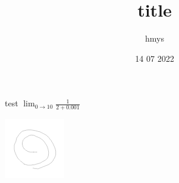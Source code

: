 \documentclass{article}
\title{title}
\author{hmys}
\date{14 07 2022}
\begin{document}
\maketitle

\par
test $\lim_{0 \to 10} \frac{1}{2 + 0.001}$

\includegraphics{drawing.png}
\end{document}
